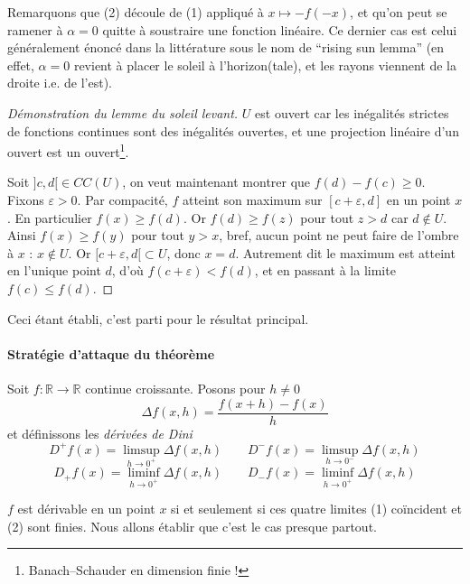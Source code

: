 \documentclass[a4paper, 11pt]{article}
\def\R{\mathbb{R}}
\begin{document}
Remarquons que (2) découle de (1) appliqué à $x \mapsto -f(-x)$, et qu'on peut
se ramener à $\alpha = 0$ quitte à soustraire une fonction linéaire. Ce dernier
cas est celui généralement énoncé dans la littérature sous le nom de
\enquote{rising sun lemma} (en effet, $\alpha = 0$ revient à placer le soleil à
l'horizon(tale), et les rayons viennent de la droite i.e. de l'est).

\begin{proof}[Démonstration du lemme du soleil levant]
  $U$ est ouvert car les inégalités strictes de fonctions continues sont des
  inégalités ouvertes, et une projection linéaire d'un ouvert est un
  ouvert\footnote{Banach--Schauder en dimension finie !}.

  Soit $]c,d[ \in CC(U)$, on veut maintenant montrer que $f(d) - f(c) \geq 0$.
  Fixons $\varepsilon > 0$. Par compacité, $f$ atteint son maximum sur
  $[c+\varepsilon, d]$ en un point $x$. En particulier $f(x) \geq f(d)$. Or
  $f(d) \geq f(z)$ pour tout $z > d$ car $d \not\in U$. Ainsi $f(x) \geq f(y)$
  pour tout $y > x$, bref, aucun point ne peut faire de l'ombre à $x$ : $x
  \not\in U$. Or $[c+\varepsilon,d[ \subset U$, donc $x = d$. Autrement dit le
  maximum est atteint en l'unique point $d$, d'où $f(c+\varepsilon) < f(d)$, et
  en passant à la limite $f(c) \leq f(d)$.
\end{proof}

Ceci étant établi, c'est parti pour le résultat principal.

\paragraph{Stratégie d'attaque du théorème}
Soit $f : \R \to \R$ continue croissante. Posons pour $h \neq 0$
\[ \Delta f(x,h) = \frac{f(x+h) - f(x)}{h} \]
et définissons les \emph{dérivées de Dini}
\[ D^+f(x) = \limsup_{h \to 0^+} \Delta f(x,h) \qquad
  D^-f(x) = \limsup_{h \to 0^-} \Delta f(x,h) \]
\[  D_+f(x) = \liminf_{h \to 0^+} \Delta f(x,h) \qquad
  D_-f(x) = \liminf_{h \to 0^+} \Delta f(x,h) \]

$f$ est dérivable en un point $x$ si et seulement si ces quatre limites (1)
coïncident et (2) sont finies. Nous allons établir que c'est le cas presque
partout.
\end{document}
